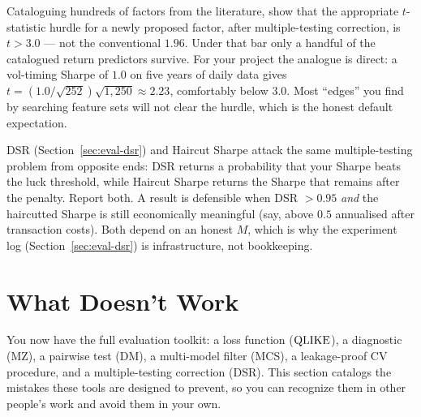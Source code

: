 \begin{keyresult}
Cataloguing hundreds of factors from the literature, \citet{HarveyLiuZhu2016} show that the appropriate $t$-statistic hurdle for a newly proposed factor, after multiple-testing correction, is $t > 3.0$ --- not the conventional $1.96$.
Under that bar only a handful of the catalogued return predictors survive.
For your project the analogue is direct: a vol-timing Sharpe of $1.0$ on five years of daily data gives $t = (1.0/\sqrt{252})\sqrt{1{,}250} \approx 2.23$, comfortably below $3.0$.
Most ``edges'' you find by searching feature sets will not clear the hurdle, which is the honest default expectation.
\end{keyresult}

\begin{keyidea}
DSR (Section~\ref{sec:eval-dsr}) and Haircut Sharpe attack the same multiple-testing problem from opposite ends: DSR returns a probability that your Sharpe beats the luck threshold, while Haircut Sharpe returns the Sharpe that remains after the penalty.
Report both.
A result is defensible when DSR $> 0.95$ \emph{and} the haircutted Sharpe is still economically meaningful (say, above $0.5$ annualised after transaction costs).
Both depend on an honest $M$, which is why the experiment log (Section~\ref{sec:eval-dsr}) is infrastructure, not bookkeeping.
\end{keyidea}


\section{What Doesn't Work}
\label{sec:eval-pitfalls}

You now have the full evaluation toolkit: a loss function ($\operatorname{QLIKE}$), a diagnostic (MZ), a pairwise test (DM), a multi-model filter (MCS), a leakage-proof CV procedure, and a multiple-testing correction (DSR).
This section catalogs the mistakes these tools are designed to prevent, so you can recognize them in other people's work and avoid them in your own.

